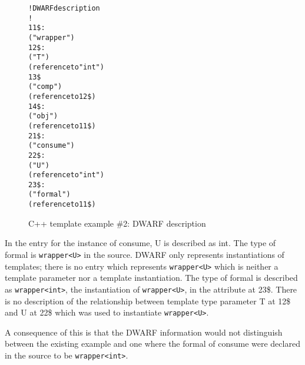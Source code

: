 \begin{figure}[h]
\begin{dwflisting}
\begin{alltt}
! DWARF description
!
11\$: 
        ("wrapper")
12\$:   
            ("T")
            (reference to "int")
13\$    
            ("comp")
            (reference to 12\$)
14\$: 
        ("obj")
        (reference to 11\$)
21\$: 
        ("consume")
22\$:   
            ("U")
            (reference to "int")
23\$:   
            ("formal")
            (reference to 11\$)
\end{alltt}
\end{dwflisting}
\caption{C++ template example \#2: DWARF description}
\label{fig:ctemplateexample2dwarf}
\end{figure}

In the  
entry for the instance of consume, U is described as int. 
The type of formal is \texttt{wrapper\textless U\textgreater} in
the source. DWARF only represents instantiations of templates;
there is no entry which represents \texttt{wrapper\textless U\textgreater} 
which is neither
a template parameter nor a template instantiation. The type
of formal is described as \texttt{wrapper\textless int\textgreater},
the instantiation of \texttt{wrapper\textless U\textgreater},
in the  attribute at 
23\$. 
There is no
description of the relationship between template type parameter
T at 12\$ and U at 22\$ which was used to instantiate
\texttt{wrapper\textless U\textgreater}.

A consequence of this is that the DWARF information would
not distinguish between the existing example and one where
the formal of consume were declared in the source to be
\texttt{wrapper\textless int\textgreater}.


